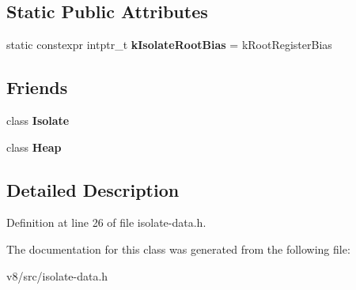 \subsection*{Static Public Attributes}
\begin{DoxyCompactItemize}
\item 
\mbox{\label{classv8_1_1internal_1_1IsolateData_a937a7477cefb41ae53a994c5e70f750d}} 
static constexpr intptr\+\_\+t {\bfseries k\+Isolate\+Root\+Bias} = k\+Root\+Register\+Bias
\end{DoxyCompactItemize}
\subsection*{Friends}
\begin{DoxyCompactItemize}
\item 
\mbox{\label{classv8_1_1internal_1_1IsolateData_aba4f0964bdacf2bbf62cf876e5d28d0a}} 
class {\bfseries Isolate}
\item 
\mbox{\label{classv8_1_1internal_1_1IsolateData_a3d69975be2e998e7bf2dcd1b1c8b4577}} 
class {\bfseries Heap}
\end{DoxyCompactItemize}


\subsection{Detailed Description}


Definition at line 26 of file isolate-\/data.\+h.



The documentation for this class was generated from the following file\+:\begin{DoxyCompactItemize}
\item 
v8/src/isolate-\/data.\+h\end{DoxyCompactItemize}
